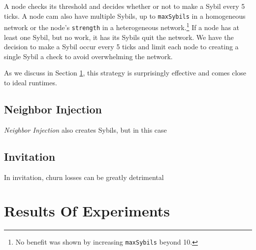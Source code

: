 A node checks its threshold and decides whether or not to make a Sybil every 5 ticks.
A node cam also have multiple Sybils, up to \texttt{maxSybils} in a homogeneous network or the node's \texttt{strength} in a heterogeneous network.\footnote{No benefit was shown by increasing \texttt{maxSybils} beyond 10.}
If a node has at least one Sybil, but no work, it has its Sybils quit the network.
We have the decision to make a Sybil occur every 5 ticks and limit each node to creating a single Sybil a check to avoid overwhelming the network.

As we discuss in Section \ref{sec:autonomous-results}, this strategy is surprisingly effective and comes close to ideal runtimes.


\subsection{Neighbor Injection}
\textit{Neighbor Injection} also creates Sybils, but in this case


\subsection{Invitation}

In invitation, churn losses can be greatly detrimental

\section{Results Of Experiments}
\label{sec:autonomous-results}


